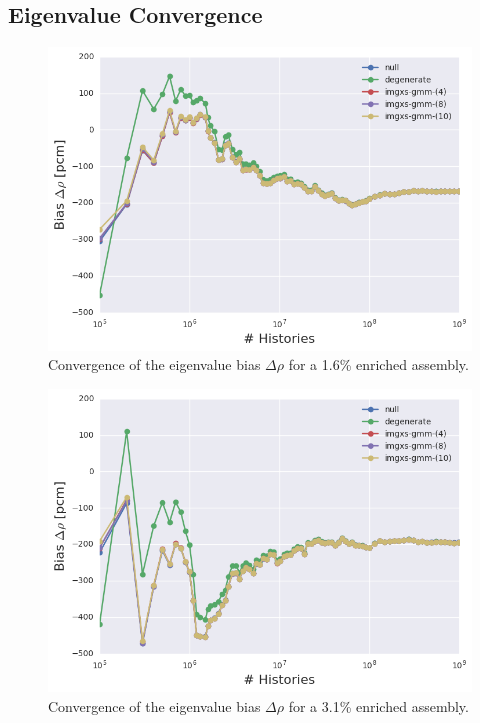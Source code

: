 \subsection{Eigenvalue Convergence}
\label{subsec:chap11-eigenvalue-converge}

\clearpage

\begin{figure}[h!]
\centering
\includegraphics[width=0.87\linewidth]{figures/results/convergence/assm-16/keff-bias-evo}
\vspace{2mm}
\caption[Eigenvalue bias covergence for a 1.6\% enriched assembly]{Convergence of the eigenvalue bias $\Delta\rho$ for a 1.6\% enriched assembly.}
\label{fig:chap11-assm-1.6-eigenvalue-converge}
\end{figure}

\begin{figure}[h!]
\centering
\includegraphics[width=0.87\linewidth]{figures/results/convergence/assm-31/keff-bias-evo}
\vspace{2mm}
\caption[Eigenvalue bias covergence for a 3.1\% enriched assembly]{Convergence of the eigenvalue bias $\Delta\rho$ for a 3.1\% enriched assembly.}
\label{fig:chap11-assm-3.1-eigenvalue-converge}
\end{figure}

